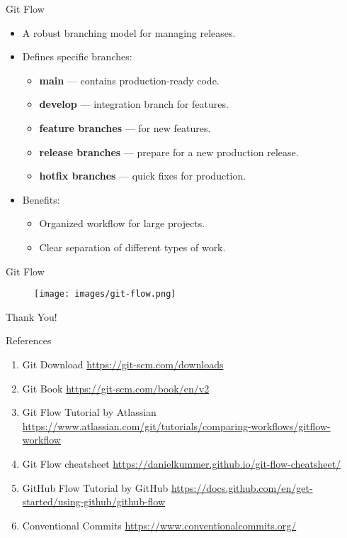 \documentclass{beamer}
\begin{document}
\begin{frame}{Git Flow}
  \begin{itemize}
      \item A robust branching model for managing releases.
      \item Defines specific branches:
      \begin{itemize}
          \item \textbf{main} --- contains production-ready code.
          \item \textbf{develop} --- integration branch for features.
          \item \textbf{feature branches} --- for new features.
          \item \textbf{release branches} --- prepare for a new production release.
          \item \textbf{hotfix branches} --- quick fixes for production.
      \end{itemize}
      \item Benefits:
      \begin{itemize}
          \item Organized workflow for large projects.
          \item Clear separation of different types of work.
      \end{itemize}
  \end{itemize}
\end{frame}

\begin{frame}{Git Flow}
  \begin{figure}[h]
    \centering
    \texttt{[image: images/git-flow.png]}
  \end{figure}
\end{frame}

\begin{frame}
    \centering
    \Huge{Thank You!}
\end{frame}

\begin{frame}{References}
  \begin{enumerate}
    \item Git Download \href{https://git-scm.com/downloads}{https://git-scm.com/downloads}
    \item Git Book \href{https://git-scm.com/book/en/v2}{https://git-scm.com/book/en/v2}
    \item Git Flow Tutorial by Atlassian \href{https://www.atlassian.com/git/tutorials/comparing-workflows/gitflow-workflow}{https://www.atlassian.com/git/tutorials/comparing-workflows/gitflow-workflow}
    \item Git Flow cheatsheet \href{https://danielkummer.github.io/git-flow-cheatsheet/}{https://danielkummer.github.io/git-flow-cheatsheet/}
    \item GitHub Flow Tutorial by GitHub \href{https://docs.github.com/en/get-started/using-github/github-flow}{https://docs.github.com/en/get-started/using-github/github-flow}
    \item Conventional Commits \href{https://www.conventionalcommits.org/}{https://www.conventionalcommits.org/}
  \end{enumerate}
\end{frame}
\end{document}
